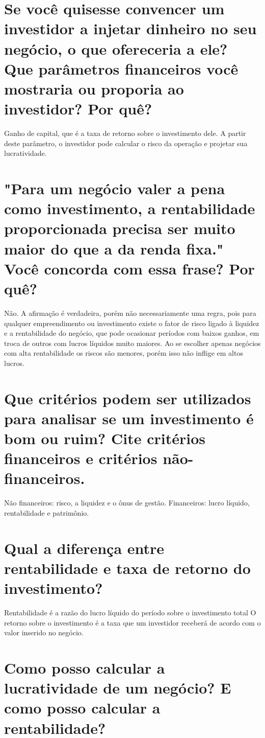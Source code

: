 \documentclass[a4paper,10pt]{article}
\begin{document}
\section{Se você quisesse convencer um investidor a injetar dinheiro no seu negócio, o que ofereceria a ele? Que parâmetros financeiros você mostraria ou proporia ao investidor? Por quê?}

Ganho de capital, que é a taxa de retorno sobre o investimento dele. A partir deste parâmetro, o investidor pode calcular o risco da operação e projetar sua lucratividade.


\section{"Para um negócio valer a pena como investimento, a rentabilidade proporcionada precisa ser muito maior do que a da renda fixa." Você concorda com essa frase? Por quê?}

Não. A afirmação é verdadeira, porém não necessariamente uma regra, pois para qualquer empreendimento ou investimento existe o fator de risco ligado à liquidez e a rentabilidade do negócio, que pode ocasionar períodos com baixos ganhos, em troca de outros com lucros líquidos muito maiores. Ao se escolher apenas negócios com alta rentabilidade os riscos são menores, porém isso não inflige em altos lucros.

\section{Que critérios podem ser utilizados para analisar se um investimento é bom ou ruim? Cite critérios financeiros e critérios não-financeiros.}

Não financeiros: risco, a liquidez e o ônus de gestão.
Financeiros: lucro líquido, rentabilidade e patrimônio.

\section{Qual  a  diferença  entre  rentabilidade  e  taxa  de  retorno  do investimento?}

Rentabilidade é a razão do lucro líquido do período sobre o investimento total
O retorno sobre o investimento é a taxa que um investidor receberá de acordo com o valor inserido no negócio.

\section{Como posso calcular a lucratividade de um negócio? E como posso calcular a rentabilidade?}
\end{document}
